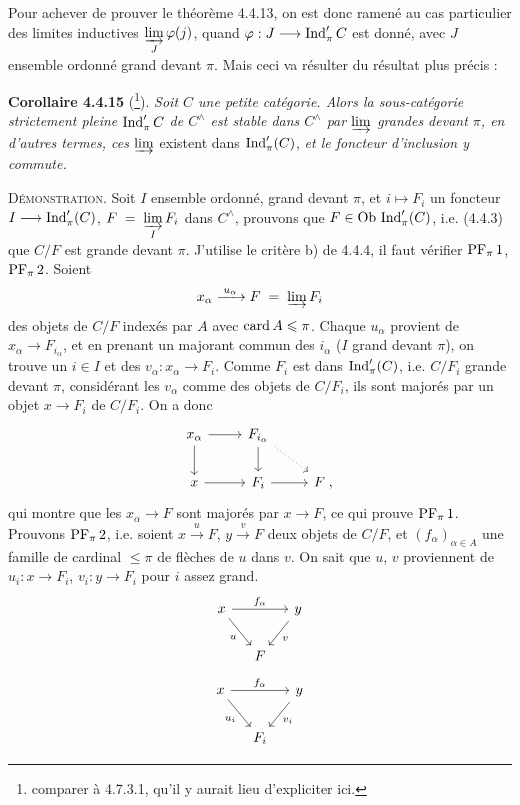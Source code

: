 Pour achever de prouver le théorème 4.4.13, on est donc ramené au cas particulier des limites inductives $\varinjlim\limits_{J}\varphi(j)$, quand $\varphi:J\longrightarrow\operatorname{Ind}'_\pi C$ est donné, avec $J$ ensemble
ordonné grand devant $\pi$. Mais ceci va résulter du résultat plus précis :

\textbf{Corollaire 4.4.15} (\footnote{comparer à 4.7.3.1, qu'il y aurait lieu d'expliciter ici.}). \textit{Soit $C$ une petite catégorie. Alors la sous-catégorie strictement pleine} $\operatorname{Ind}'_\pi C$ \textit{de $C^\wedge$ est stable dans $C^\wedge$ par $\varinjlim$ grandes devant $\pi$, en d'autres termes, ces $\varinjlim$} existent dans $\operatorname{Ind}'_\pi(C)$, \textit{et le foncteur d'inclusion y commute.} %

\textsc{Démonstration}. Soit $I$ ensemble ordonné, grand devant $\pi$, et $i\longmapsto F_i$ un foncteur $I\longrightarrow\operatorname{Ind}'_\pi(C)$, $F\;=\;\varinjlim\limits_{I}F_i$ dans $C^\wedge$, prouvons que $F\in\mathrm{Ob}\,\operatorname{Ind}'_\pi(C)$, i.e. (4.4.3) que $C/F$ est grande devant $\pi$. J'utilise le critère b) de 4.4.4, il faut vérifier $\mathrm{PF}_\pi\,1$, $\mathrm{PF}_\pi\,2$. Soient
\[
x_\alpha\xrightarrow{\;u_\alpha\;}F\;=\;\varinjlim F_i
\]
des objets de $C/F$ indexés par $A$ avec $\operatorname{card} A\leqslant\pi$. Chaque $u_\alpha$ provient de $x_\alpha\longrightarrow F_{i_\alpha}$, et en prenant un majorant commun des $i_\alpha$ ($I$ grand devant $\pi$), on trouve un $i\in I$ et des $v_\alpha:x_\alpha\longrightarrow F_i$. Comme $F_i$ est dans $\operatorname{Ind}'_\pi(C)$, i.e. $C/F_i$ grande devant $\pi$, considérant les $v_\alpha$ comme des objets de $C/F_i$, ils sont majorés par un objet $x\longrightarrow F_i$ de $C/F_i$. On a donc
\[
\begin{tikzcd}
x_\alpha \arrow[r] \arrow[d] & F_{i_\alpha} \arrow[d] \arrow[dr, dotted] & \\
x \arrow[r] & F_i \arrow[r] & F\;,
\end{tikzcd}
\]
qui montre que les $x_\alpha\longrightarrow F$ sont majorés par $x\longrightarrow F$,
ce qui prouve $\mathrm{PF}_\pi\,1$. Prouvons $\mathrm{PF}_\pi\,2$, i.e. soient $x\xrightarrow{\;u\;}F$, $y\xrightarrow{\;v\;}F$ deux objets de $C/F$, et $(f_\alpha)_{\alpha\in A}$ une famille de cardinal $\leqslant\pi$ de flèches de $u$ dans $v$. On sait que $u$, $v$ proviennent de $u_i:x\longrightarrow F_i$, $v_i:y\longrightarrow F_i$ pour $i$ assez grand.
\[
\begin{tikzcd}[column sep=small]
x \arrow[rr, "f_\alpha"] \arrow[dr, "u"'] & & y \arrow[dl, "v"] \\
& F &
\end{tikzcd}
\]
\[
\begin{tikzcd}[column sep=small]
x \arrow[rr, "f_\alpha"] \arrow[dr, "u_i"'] & & y \arrow[dl, "v_i"] \\
& F_i &
\end{tikzcd}
\]

